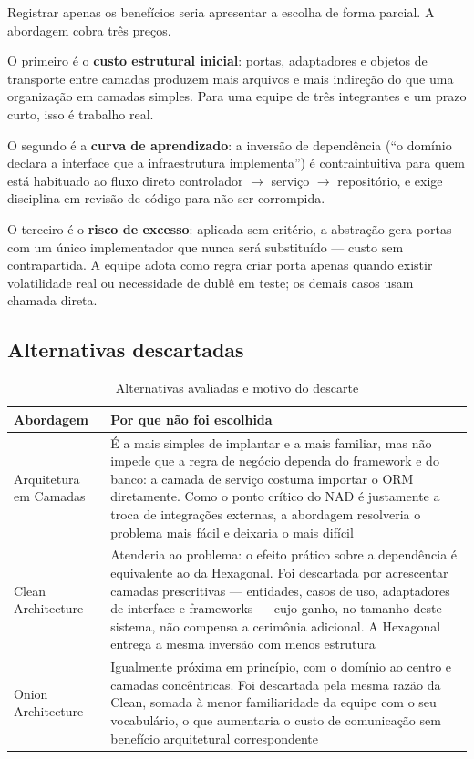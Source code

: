 \documentclass[12pt,a4paper,oneside]{article}
\newcommand{\fonte}[1]{\par\vspace{5pt}{\footnotesize\singlespacing Fonte: #1\par}}
\newcommand{\cab}[1]{\textbf{\footnotesize #1}}
\begin{document}
Registrar apenas os benefícios seria apresentar a escolha de forma parcial. A
abordagem cobra três preços.

O primeiro é o \textbf{custo estrutural inicial}: portas, adaptadores e objetos
de transporte entre camadas produzem mais arquivos e mais indireção do que uma
organização em camadas simples. Para uma equipe de três integrantes e um prazo
curto, isso é trabalho real.

O segundo é a \textbf{curva de aprendizado}: a inversão de dependência
(``o domínio declara a interface que a infraestrutura implementa'') é
contraintuitiva para quem está habituado ao fluxo direto controlador
$\rightarrow$ serviço $\rightarrow$ repositório, e exige disciplina em revisão
de código para não ser corrompida.

O terceiro é o \textbf{risco de excesso}: aplicada sem critério, a abstração
gera portas com um único implementador que nunca será substituído — custo sem
contrapartida. A equipe adota como regra criar porta apenas quando existir
volatilidade real ou necessidade de dublê em teste; os demais casos usam
chamada direta.

\subsection{Alternativas descartadas}

\begin{table}[H]
\centering
\caption{Alternativas avaliadas e motivo do descarte}
\label{tab:descartadas}
{\small\singlespacing
\begin{tabularx}{\textwidth}{L{3.4cm} X}
\toprule
\cab{Abordagem} & \cab{Por que não foi escolhida} \\
\midrule
Arquitetura em Camadas & É a mais simples de implantar e a mais familiar, mas
não impede que a regra de negócio dependa do framework e do banco: a camada de
serviço costuma importar o ORM diretamente. Como o ponto crítico do NAD é
justamente a troca de integrações externas, a abordagem resolveria o problema
mais fácil e deixaria o mais difícil \\
\addlinespace
Clean Architecture & Atenderia ao problema: o efeito prático sobre a
dependência é equivalente ao da Hexagonal. Foi descartada por acrescentar
camadas prescritivas — entidades, casos de uso, adaptadores de interface e
frameworks — cujo ganho, no tamanho deste sistema, não compensa a cerimônia
adicional. A Hexagonal entrega a mesma inversão com menos estrutura \\
\addlinespace
Onion Architecture & Igualmente próxima em princípio, com o domínio ao centro e
camadas concêntricas. Foi descartada pela mesma razão da Clean, somada à menor
familiaridade da equipe com o seu vocabulário, o que aumentaria o custo de
comunicação sem benefício arquitetural correspondente \\
\bottomrule
\end{tabularx}}
\fonte{elaborado pelos autores (2026).}
\end{table}
\end{document}
